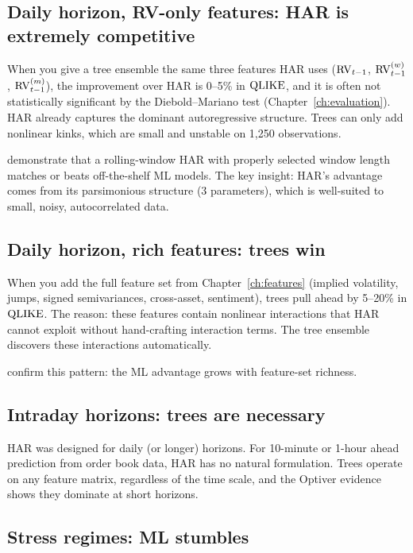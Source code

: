 \subsection*{Daily horizon, RV-only features: HAR is extremely competitive}

When you give a tree ensemble the same three features HAR uses ($\operatorname{RV}_{t-1}$,
$\operatorname{RV}^{(w)}_{t-1}$, $\operatorname{RV}^{(m)}_{t-1}$), the improvement over HAR is 0--5\%
in $\operatorname{QLIKE}$, and it is often not statistically significant by the
Diebold--Mariano test (Chapter~\ref{ch:evaluation}).  HAR already captures
the dominant autoregressive structure.  Trees can only add nonlinear kinks,
which are small and unstable on 1,250 observations.

\citet{HARdToBeat2024} demonstrate that a rolling-window HAR with properly
selected window length matches or beats off-the-shelf ML models.  The key
insight: HAR's advantage comes from its parsimonious structure (3 parameters),
which is well-suited to small, noisy, autocorrelated data.

\subsection*{Daily horizon, rich features: trees win}

When you add the full feature set from Chapter~\ref{ch:features} (implied
volatility, jumps, signed semivariances, cross-asset, sentiment), trees pull
ahead by 5--20\% in $\operatorname{QLIKE}$.  The reason: these features contain nonlinear
interactions that HAR cannot exploit without hand-crafting interaction terms.
The tree ensemble discovers these interactions automatically.

\citet{ChristensenSiggaardVeliyev2023} confirm this pattern: the ML
advantage grows with feature-set richness.

\subsection*{Intraday horizons: trees are necessary}

HAR was designed for daily (or longer) horizons.  For 10-minute or 1-hour
ahead prediction from order book data, HAR has no natural formulation.
Trees operate on any feature matrix, regardless of the time scale, and the
Optiver evidence shows they dominate at short horizons.

\subsection*{Stress regimes: ML stumbles}

